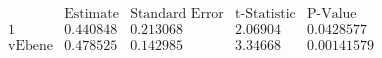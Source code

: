 \[\begin{array}{l|llll}
 \text{} & \text{Estimate} & \text{Standard Error} & \text{t-Statistic} & \text{P-Value} \\
\hline
 1 & 0.440848 & 0.213068 & 2.06904 & 0.0428577 \\
 \text{vEbene} & 0.478525 & 0.142985 & 3.34668 & 0.00141579 \\
\end{array}\]

